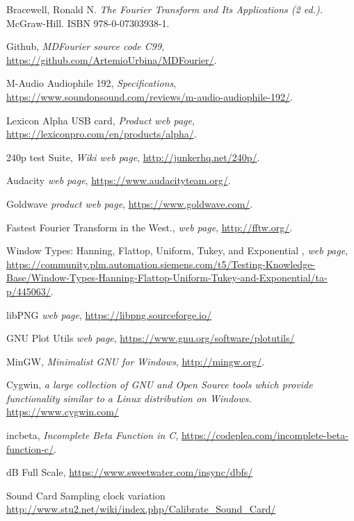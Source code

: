 \documentclass[10pt,a4paper]{report}
\begin{document}
\begin{thebibliography}{9}
	Bracewell, Ronald N. 
	\textit{The Fourier Transform and Its Applications (2 ed.).}
	McGraw-Hill. ISBN 978-0-07303938-1.
	
	Github,
	\textit{MDFourier source code C99},
	\url{https://github.com/ArtemioUrbina/MDFourier/}.
	
	M-Audio Audiophile 192,
	\textit{Specifications},
	\url{https://www.soundonsound.com/reviews/m-audio-audiophile-192/}.
	
	Lexicon Alpha USB card,
	\textit{Product web page},
	\url{https://lexiconpro.com/en/products/alpha/}.
	
	240p test Suite,
	\textit{Wiki web page},
	\url{http://junkerhq.net/240p/}.
	
	Audacity
	\textit{web page},
	\url{https://www.audacityteam.org/}.
	
	Goldwave
	\textit{product web page},
	\url{https://www.goldwave.com/}.
	
	Fastest Fourier Transform in the West.,
	\textit{web page},
	\url{http://fftw.org/}.
	
	Window Types: Hanning, Flattop, Uniform, Tukey, and Exponential ,
	\textit{web page},
	\url{https://community.plm.automation.siemens.com/t5/Testing-Knowledge-Base/Window-Types-Hanning-Flattop-Uniform-Tukey-and-Exponential/ta-p/445063/}.
	
	libPNG
	\textit{web page},
	\url{https://libpng.sourceforge.io/}
	
	GNU Plot Utils
	\textit{web page},
	\url{https://www.gnu.org/software/plotutils/}
	
	MinGW, 
	\textit{Minimalist GNU for Windows},
	\url{http://mingw.org/}.
	
	Cygwin,
	\textit{a large collection of GNU and Open Source tools which provide functionality similar to a Linux distribution on Windows.}
	\url{https://www.cygwin.com/}
	
	incbeta, 
	\textit{Incomplete Beta Function in C},
	\url{https://codeplea.com/incomplete-beta-function-c/}.
	
	dB Full Scale, 
	\url{https://www.sweetwater.com/insync/dbfs/}
	
	Sound Card Sampling clock variation
	\url{http://www.stu2.net/wiki/index.php/Calibrate_Sound_Card/}
	

\end{thebibliography}
\end{document}

